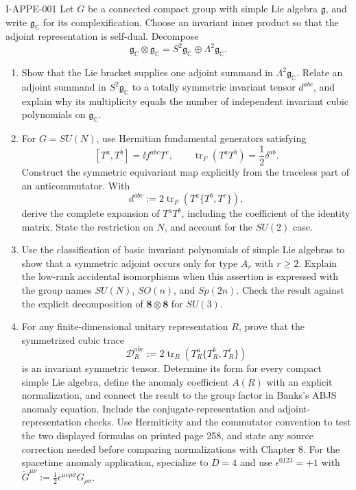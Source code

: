 \begin{exercise}{I-APPE-001}
Let $G$ be a connected compact group with simple Lie algebra $\mathfrak g$, and
write $\mathfrak g_{\mathbb C}$ for its complexification.  Choose an invariant
inner product so that the adjoint representation is self-dual.  Decompose
\[
  \mathfrak g_{\mathbb C}\otimes\mathfrak g_{\mathbb C}
  =S^2\mathfrak g_{\mathbb C}\oplus\Lambda^2\mathfrak g_{\mathbb C}.
\]

\begin{enumerate}[label=(\alph*)]
\item Show that the Lie bracket supplies one adjoint summand in
$\Lambda^2\mathfrak g_{\mathbb C}$.  Relate an adjoint summand in
$S^2\mathfrak g_{\mathbb C}$ to a totally symmetric invariant tensor
$d^{abc}$, and explain why its multiplicity equals the number of independent
invariant cubic polynomials on $\mathfrak g_{\mathbb C}$.

\item For $G=SU(N)$, use Hermitian fundamental generators satisfying
\[
  [T^a,T^b]=\ii f^{abc}T^c,
  \qquad \operatorname{tr}_F(T^aT^b)=\frac12\delta^{ab}.
\]
Construct the symmetric equivariant map explicitly from the traceless part of
an anticommutator.  With
\[
  d^{abc}:=2\operatorname{tr}_F\!\left(T^a\{T^b,T^c\}\right),
\]
derive the complete expansion of $T^aT^b$, including the coefficient of the
identity matrix.  State the restriction on $N$, and account for the $SU(2)$
case.

\item Use the classification of basic invariant polynomials of simple Lie
algebras to show that a symmetric adjoint occurs only for type $A_r$ with
$r\geq2$.  Explain the low-rank accidental isomorphisms when this assertion
is expressed with the group names $SU(N)$, $SO(n)$, and $Sp(2n)$.  Check the
result against the explicit decomposition of
$\boldsymbol 8\otimes\boldsymbol 8$ for $SU(3)$.

\item For any finite-dimensional unitary representation $R$, prove that the
symmetrized cubic trace
\[
  \mathcal D_R^{abc}
  :=2\operatorname{tr}_R\!\left(T_R^a\{T_R^b,T_R^c\}\right)
\]
is an invariant symmetric tensor.  Determine its form for every compact
simple Lie algebra, define the anomaly coefficient $A(R)$ with an explicit
normalization, and connect the result to the group factor in Banks's ABJS
anomaly equation.  Include the conjugate-representation and
adjoint-representation checks.  Use Hermiticity and the commutator convention
to test the two displayed formulas on printed page 258, and state any source
correction needed before comparing normalizations with Chapter 8.
For the spacetime anomaly application, specialize to $D=4$ and use
$\epsilon^{0123}=+1$ with
$\widetilde G^{\mu\nu}:=\frac12\epsilon^{\mu\nu\rho\sigma}G_{\rho\sigma}$.
\end{enumerate}
\end{exercise}
